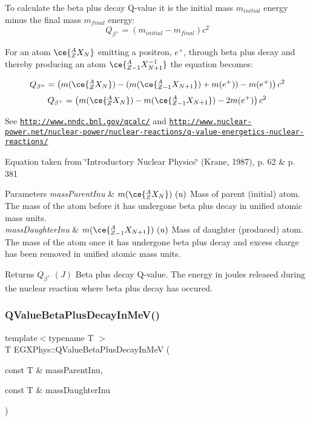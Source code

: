 To calculate the beta plus decay Q-\/value it is the initial mass $m_{initial}$ energy minus the final mass $m_{final}$ energy\+: \[Q_{\beta^+} = \left ( m_{initial}-m_{final}\right ) c^2\]

For an atom $\ce{ ^{A}_{Z}X_{N} }$ emitting a positron, $e^+$, through beta plus decay and thereby producing an atom $\ce{ ^{A}_{Z{-1}}X^{-1}_{N{+1}} }$ the equation becomes\+:

\[Q_{\beta^+} = \left ( m(\ce{ ^{A}_{Z}X_{N} }) - (m(\ce{ ^{A}_{Z{-1}}X_{N{+1}} }) + m(e^+)) - m(e^+)\right ) c^2\] \[Q_{\beta^+} = \left ( m(\ce{ ^{A}_{Z}X_{N} }) - m(\ce{ ^{A}_{Z{-1}}X_{N{+1}} }) - 2m(e^+)\right ) c^2\]

See \href{http://www.nndc.bnl.gov/qcalc/}{\tt http\+://www.\+nndc.\+bnl.\+gov/qcalc/} and \href{http://www.nuclear-power.net/nuclear-power/nuclear-reactions/q-value-energetics-nuclear-reactions/}{\tt http\+://www.\+nuclear-\/power.\+net/nuclear-\/power/nuclear-\/reactions/q-\/value-\/energetics-\/nuclear-\/reactions/}

Equation taken from \char`\"{}\+Introductory Nuclear Physics\char`\"{} (Krane, 1987), p. 62 \& p. 381


\begin{DoxyParams}{Parameters}
{\em mass\+Parent\+Inu} & $m(\ce{ ^{A}_{Z}X_{N} })\ (u)$ Mass of parent (initial) atom. The mass of the atom before it has undergone beta plus decay in unified atomic mass units. \\
\hline
{\em mass\+Daughter\+Inu} & $m(\ce{ ^{A}_{Z{-1}}X_{N{+1}} })\ (u)$ Mass of daughter (produced) atom. The mass of the atom once it has undergone beta plus decay and excess charge has been removed in unified atomic mass units. \\
\hline
\end{DoxyParams}
\begin{DoxyReturn}{Returns}
$Q_{\beta^+}\ (J)$ Beta plus decay Q-\/value. The energy in joules released during the nuclear reaction where beta plus decay has occured. 
\end{DoxyReturn}
\mbox{\label{group___q_value_ga9bf549cd4f8e1c76e9cc41b72d4f0279}} 
\subsubsection{\texorpdfstring{Q\+Value\+Beta\+Plus\+Decay\+In\+Me\+V()}{QValueBetaPlusDecayInMeV()}}
{\footnotesize\ttfamily template$<$typename T $>$ \\
T E\+G\+X\+Phys\+::\+Q\+Value\+Beta\+Plus\+Decay\+In\+MeV (\begin{DoxyParamCaption}\item[{const T \&}]{mass\+Parent\+Inu,  }\item[{const T \&}]{mass\+Daughter\+Inu }\end{DoxyParamCaption})}



